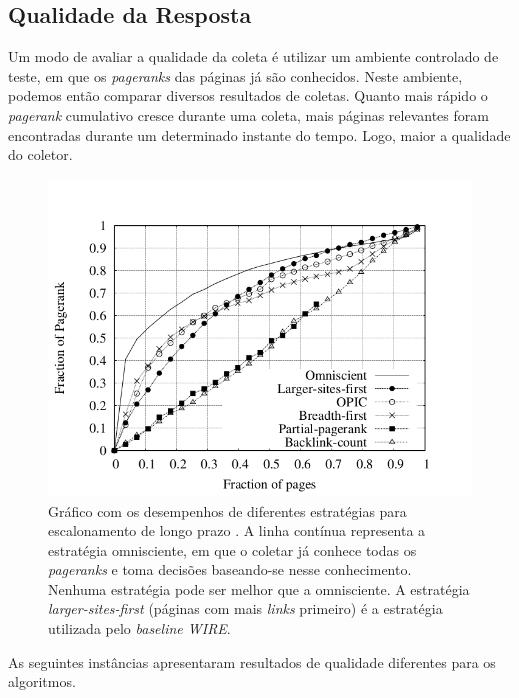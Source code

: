 \documentclass[a4paper,12pt,titlepage]{article}
\begin{document}
\subsection{Qualidade da Resposta}

Um modo de avaliar a qualidade da coleta é utilizar um ambiente controlado de teste, em que os \textit{pageranks} das páginas já são conhecidos. Neste ambiente, podemos então comparar diversos resultados de coletas. Quanto mais rápido o \textit{pagerank} cumulativo cresce durante uma coleta, mais páginas relevantes foram encontradas durante um determinado instante do tempo. Logo, maior a qualidade do coletor.

\begin{figure}[H]
     \centering
     \includegraphics[scale=0.45]{figures/performance.png}
     \caption{Gráfico com os desempenhos de diferentes estratégias para escalonamento de longo prazo \cite{carlos}. A linha contínua representa a estratégia omnisciente, em que o coletar já conhece todas os \textit{pageranks} e toma decisões baseando-se nesse conhecimento. Nenhuma estratégia pode ser melhor que a omnisciente. A estratégia \textit{larger-sites-first} (páginas com mais \textit{links} primeiro) é a estratégia utilizada pelo \textit{baseline WIRE}.}
     \label{bsp}
\end{figure}

As seguintes instâncias apresentaram resultados de qualidade diferentes para os algoritmos.
\end{document}
